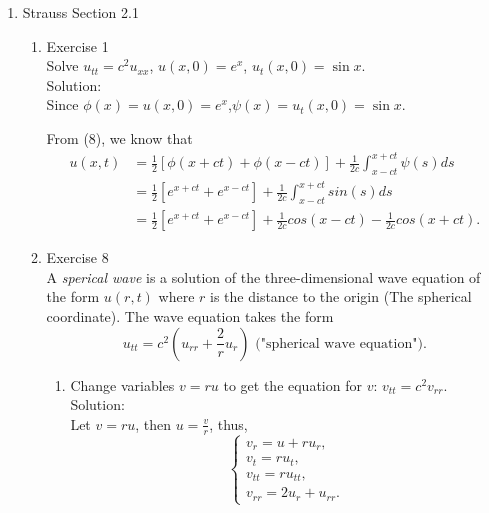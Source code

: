 \documentclass[12pt]{article}%
\begin{document}
\begin{enumerate}
    \pagebreak
    
    \item Strauss Section 2.1 \smallskip
    \begin{enumerate}
        \item Exercise 1 \smallskip \\
        Solve $u_{tt} = c^2u_{xx}$, $u\left(x,0\right) = e^x$, $u_t\left(x,0\right) = \sin{x}$. \smallskip \\
        Solution:\\
        Since $\phi(x)=u\left(x,0\right) = e^x$,$\psi(x)=u_t\left(x,0\right) = \sin{x}.$

        From (8), we know that
        \begin{align*}
            u(x,t)&=\frac{1}{2}[\phi(x+ct)+\phi(x-ct)]+\frac{1}{2c}\int_{x-ct}^{x+ct}\psi(s)ds\\
                  &=\frac{1}{2}[e^{x+ct}+e^{x-ct}]+\frac{1}{2c}\int_{x-ct}^{x+ct}sin(s)ds\\
                  &=\frac{1}{2}[e^{x+ct}+e^{x-ct}]+\frac{1}{2c}cos(x-ct)-\frac{1}{2c}cos(x+ct).
        \end{align*}
        \item Exercise 8 \smallskip \\
        A \emph{sperical wave} is a solution of the three-dimensional wave equation of the form $u\left(r,t\right)$ where $r$ is the distance to the origin (The spherical coordinate). The wave equation takes the form
        $$u_{tt} = c^2\left(u_{rr} + \frac{2}{r}u_r\right) \text{    ("spherical wave equation").}$$
        \begin{enumerate}
            \item Change variables $v= ru$ to get the equation for $v$:  $v_{tt} = c^2v_{rr}$. \smallskip \\
            Solution:\\
            Let $v=ru$, then $u=\frac{v}{r}$, thus, 
            \begin{equation}\label{v-equ}
                \begin{cases}
                    v_{r}=u+ru_{r},
                    \\
                    v_{t}=ru_{t},
                    \\
                    v_{tt}=ru_{tt},
                    \\
                    v_{rr}=2u_{r}+u_{rr}.
                \end{cases}

\end{equation}
\end{enumerate}
\end{enumerate}
\end{enumerate}
\end{document}
